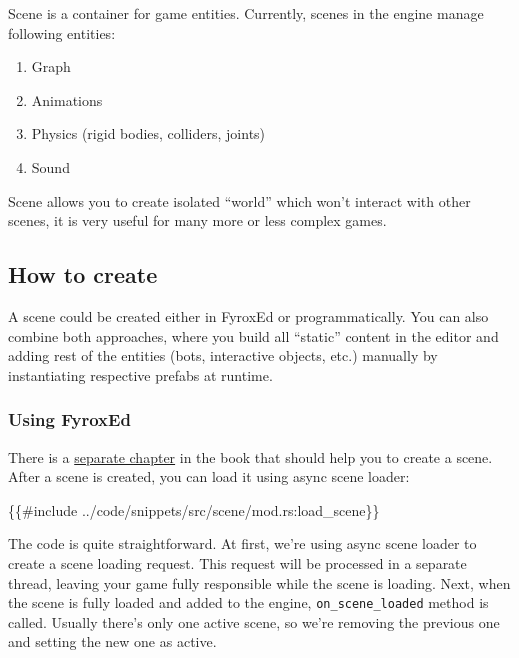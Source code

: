 \documentclass[
]{book}
\newenvironment{Shaded}{\begin{snugshade}}{\end{snugshade}}
\newcommand{\NormalTok}[1]{#1}
\providecommand{\tightlist}{%
  \setlength{\itemsep}{0pt}\setlength{\parskip}{0pt}}
\theoremstyle{definition}
\theoremstyle{definition}
\theoremstyle{definition}
\theoremstyle{definition}
\theoremstyle{remark}
\begin{document}
Scene is a container for game entities. Currently, scenes in the engine manage following entities:

\begin{enumerate}
\def\labelenumi{\arabic{enumi})}
\tightlist
\item
  Graph
\item
  Animations
\item
  Physics (rigid bodies, colliders, joints)
\item
  Sound
\end{enumerate}

Scene allows you to create isolated ``world'' which won't interact with other scenes, it is very useful for many more or less complex games.

\subsection{How to create}\label{how-to-create}

A scene could be created either in FyroxEd or programmatically. You can also combine both approaches, where you build all ``static'' content in the editor and adding rest of the entities (bots, interactive objects, etc.) manually by instantiating respective prefabs at runtime.

\subsubsection{Using FyroxEd}\label{using-fyroxed}

There is a \href{../beginning/editor_overview.md}{separate chapter} in the book that should help you to create a scene. After a scene is created, you can load it using async scene loader:

\begin{Shaded}
\begin{Highlighting}[]
\NormalTok{\{\{\#include ../code/snippets/src/scene/mod.rs:load\_scene\}\}}
\end{Highlighting}
\end{Shaded}

The code is quite straightforward. At first, we're using async scene loader to create a scene loading request. This request will be processed in a separate thread, leaving your game fully responsible while the scene is loading. Next, when the scene is fully loaded and added to the engine, \texttt{on\_scene\_loaded} method is called. Usually there's only one active scene, so we're removing the previous one and setting the new one as active.
\end{document}
